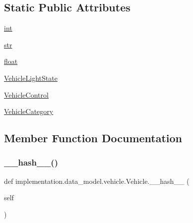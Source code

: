 \subsection*{Static Public Attributes}
\begin{DoxyCompactItemize}
\item 
\hyperlink{classimplementation_1_1data__model_1_1vehicle_1_1_vehicle_aa942b836bd6fa833c5d3789b10c2ada5}{int}
\item 
\hyperlink{classimplementation_1_1data__model_1_1vehicle_1_1_vehicle_a05d792fb397d5ec7acb7335449622f2f}{str}
\item 
\hyperlink{classimplementation_1_1data__model_1_1vehicle_1_1_vehicle_a2f5cd50538d2080f651dd154c1597e80}{float}
\item 
\hyperlink{classimplementation_1_1data__model_1_1vehicle_1_1_vehicle_a3530d8bb1b04006bec3e363071b2b87d}{Vehicle\+Light\+State}
\item 
\hyperlink{classimplementation_1_1data__model_1_1vehicle_1_1_vehicle_ad98d81e5e18f2fbd49fd20056d9fb43d}{Vehicle\+Control}
\item 
\hyperlink{classimplementation_1_1data__model_1_1vehicle_1_1_vehicle_a5c505c6d69ccd0737d00d1bc203f78cc}{Vehicle\+Category}
\end{DoxyCompactItemize}


\subsection{Member Function Documentation}
\mbox{\label{classimplementation_1_1data__model_1_1vehicle_1_1_vehicle_a9252c162137f564dfcec306c08f22eba}} 
\subsubsection{\texorpdfstring{\+\_\+\+\_\+hash\+\_\+\+\_\+()}{\_\_hash\_\_()}}
{\footnotesize\ttfamily def implementation.\+data\+\_\+model.\+vehicle.\+Vehicle.\+\_\+\+\_\+hash\+\_\+\+\_\+ (\begin{DoxyParamCaption}\item[{}]{self }\end{DoxyParamCaption})}

